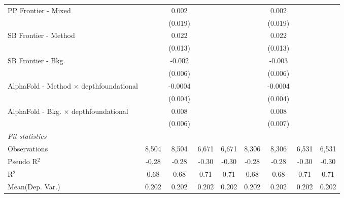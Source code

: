 \begin{tabular}{lcccccccc}
   PP Frontier - Mixed                            &               & 0.002        &       &       &               & 0.002        &       &   \\   
                                                  &               & (0.019)      &       &       &               & (0.019)      &       &   \\   
   SB Frontier - Method                           &               & 0.022        &       &       &               & 0.022        &       &   \\   
                                                  &               & (0.013)      &       &       &               & (0.013)      &       &   \\   
   SB Frontier - Bkg.                             &               & -0.002       &       &       &               & -0.003       &       &   \\   
                                                  &               & (0.006)      &       &       &               & (0.006)      &       &   \\   
   AlphaFold - Method $\times$ depthfoundational  &               & -0.0004      &       &       &               & -0.0004      &       &   \\   
                                                  &               & (0.004)      &       &       &               & (0.004)      &       &   \\   
   AlphaFold - Bkg. $\times$ depthfoundational    &               & 0.008        &       &       &               & 0.008        &       &   \\   
                                                  &               & (0.006)      &       &       &               & (0.007)      &       &   \\   
   \midrule
   \emph{Fit statistics}\\
   Observations                                   & 8,504         & 8,504        & 6,671 & 6,671 & 8,306         & 8,306        & 6,531 & 6,531\\  
   Pseudo R$^2$                                   & -0.28         & -0.28        & -0.30 & -0.30 & -0.28         & -0.28        & -0.30 & -0.30\\  
   R$^2$                                          & 0.68          & 0.68         & 0.71  & 0.71  & 0.68          & 0.68         & 0.71  & 0.71\\  
Mean(Dep. Var.) & 0.202 & 0.202 & 0.202 & 0.202 & 0.202 & 0.202 & 0.202 & 0.202 \\
   

\end{tabular}
